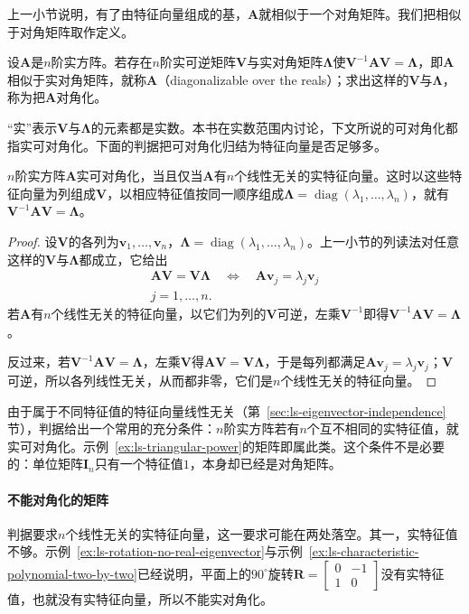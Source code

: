上一小节说明，有了由特征向量组成的基，$\bm A$就相似于一个对角矩阵。我们把相似于对角矩阵取作定义。
\begin{definition}[实可对角化]
\label{def:ls-real-diagonalizable}
设$\bm A$是$n$阶实方阵。若存在$n$阶实可逆矩阵$\bm V$与实对角矩阵$\bm\Lambda$使$\bm V^{-1}\bm A\bm V=\bm\Lambda$，即$\bm A$相似于实对角矩阵，就称$\bm A$（diagonalizable over the reals）；求出这样的$\bm V$与$\bm\Lambda$，称为把$\bm A$对角化。
\end{definition}
“实”表示$\bm V$与$\bm\Lambda$的元素都是实数。本书在实数范围内讨论，下文所说的可对角化都指实可对角化。下面的判据把可对角化归结为特征向量是否足够多。
\begin{theorem}[对角化判据]
\label{thm:ls-diagonalization-criterion}
$n$阶实方阵$\bm A$实可对角化，当且仅当$\bm A$有$n$个线性无关的实特征向量。这时以这些特征向量为列组成$\bm V$，以相应特征值按同一顺序组成$\bm\Lambda=\operatorname{diag}(\lambda_1,\ldots,\lambda_n)$，就有$\bm V^{-1}\bm A\bm V=\bm\Lambda$。
\end{theorem}
\begin{proof}
设$\bm V$的各列为$\bm v_1,\ldots,\bm v_n$，$\bm\Lambda=\operatorname{diag}(\lambda_1,\ldots,\lambda_n)$。上一小节的列读法对任意这样的$\bm V$与$\bm\Lambda$都成立，它给出
\[
 \begin{gathered}
\bm A\bm V=\bm V\bm\Lambda
 \quad\Longleftrightarrow\quad
 \bm A\bm v_j=\lambda_j\bm v_j\\
j=1,\ldots,n.
 \end{gathered}
\]
若$\bm A$有$n$个线性无关的特征向量，以它们为列的$\bm V$可逆，左乘$\bm V^{-1}$即得$\bm V^{-1}\bm A\bm V=\bm\Lambda$。

反过来，若$\bm V^{-1}\bm A\bm V=\bm\Lambda$，左乘$\bm V$得$\bm A\bm V=\bm V\bm\Lambda$，于是每列都满足$\bm A\bm v_j=\lambda_j\bm v_j$；$\bm V$可逆，所以各列线性无关，从而都非零，它们是$n$个线性无关的特征向量。
\end{proof}
由于属于不同特征值的特征向量线性无关（第~\ref{sec:ls-eigenvector-independence}节），判据给出一个常用的充分条件：$n$阶实方阵若有$n$个互不相同的实特征值，就实可对角化。示例~\ref{ex:ls-triangular-power}的矩阵即属此类。这个条件不是必要的：单位矩阵$\bm I_n$只有一个特征值$1$，本身却已经是对角矩阵。

\paragraph{不能对角化的矩阵}
判据要求$n$个线性无关的实特征向量，这一要求可能在两处落空。其一，实特征值不够。示例~\ref{ex:ls-rotation-no-real-eigenvector}与示例~\ref{ex:ls-characteristic-polynomial-two-by-two}已经说明，平面上的$90^\circ$旋转$\bm R=\left[\begin{smallmatrix}0&-1\\1&0\end{smallmatrix}\right]$没有实特征值，也就没有实特征向量，所以不能实对角化。

